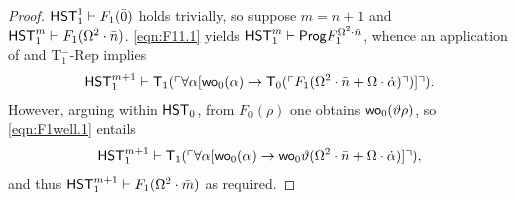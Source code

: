 \documentclass[UKenglish,cleveref,DIV=12]{scrartcl}
\theoremstyle{definition}
\theoremstyle{definition}
\begin{document}
\begin{proof}
$\mathsf{HST}_1^1\vdash F_1(\bar 0)$ holds trivially, so suppose $m=n+1$ and $\mathsf{HST}_1^m\vdash F_1(\Omega^2\cdot\bar n)$.
\eqref{eqn:F11.1} yields $\mathsf{HST}_1^m\vdash \mathsf{Prog}  F_1^{\Omega^2\cdot\bar n}$, whence an application of  and T$^-_1$-Rep implies
\begin{align}\label{eqn:F1well.1}
  \mathsf{HST}_1^{m+1}\vdash \mathsf{T}_1(\ulcorner{\forall\alpha[\mathsf{wo}_0(\alpha)\rightarrow \mathsf{T}_0(\ulcorner{F_1(\Omega^2\cdot\bar n+\Omega\cdot\dot\alpha)}\urcorner)]}\urcorner).
\end{align}
However, arguing within $\mathsf{HST}_0$, from $F_0(\rho)$ one obtains $\mathsf{wo}_0(\vartheta\rho)$, so \eqref{eqn:F1well.1} entails
\begin{align*}
  \mathsf{HST}_1^{m+1}\vdash \mathsf{T}_1(\ulcorner{\forall\alpha[\mathsf{wo}_0(\alpha)\rightarrow \mathsf{wo}_0\vartheta(\Omega^2\cdot\bar n+\Omega\cdot \dot\alpha)]}\urcorner),
\end{align*}
and thus $\mathsf{HST}_1^{m+1}\vdash F_1(\Omega^2\cdot\bar m)$ as required.
\end{proof}
\end{document}
